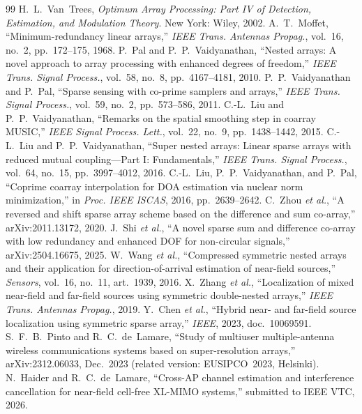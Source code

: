 \documentclass[11pt]{article}
\begin{document}
\begin{thebibliography}{99}\small
{} H.~L.~Van~Trees, \emph{Optimum Array Processing: Part IV of Detection,
Estimation, and Modulation Theory}. New York: Wiley, 2002.
 A.~T.~Moffet, ``Minimum-redundancy linear arrays,'' \emph{IEEE Trans.
Antennas Propag.}, vol.~16, no.~2, pp.~172--175, 1968.
 P.~Pal and P.~P.~Vaidyanathan, ``Nested arrays: A novel approach to array
processing with enhanced degrees of freedom,'' \emph{IEEE Trans. Signal Process.}, vol.~58, no.~8,
pp.~4167--4181, 2010.
 P.~P.~Vaidyanathan and P.~Pal, ``Sparse sensing with co-prime
samplers and arrays,'' \emph{IEEE Trans. Signal Process.}, vol.~59, no.~2, pp.~573--586, 2011.
 C.-L.~Liu and P.~P.~Vaidyanathan, ``Remarks on the spatial smoothing step in
coarray MUSIC,'' \emph{IEEE Signal Process. Lett.}, vol.~22, no.~9, pp.~1438--1442, 2015.
 C.-L.~Liu and P.~P.~Vaidyanathan, ``Super nested arrays: Linear sparse
arrays with reduced mutual coupling---Part I: Fundamentals,'' \emph{IEEE Trans. Signal Process.},
vol.~64, no.~15, pp.~3997--4012, 2016.
 C.-L.~Liu, P.~P.~Vaidyanathan, and P.~Pal, ``Coprime coarray interpolation
for DOA estimation via nuclear norm minimization,'' in \emph{Proc. IEEE ISCAS}, 2016, pp.~2639--2642.
 C.~Zhou \emph{et al.}, ``A reversed and shift sparse array scheme based on
the difference and sum co-array,'' arXiv:2011.13172, 2020.
 J.~Shi \emph{et al.}, ``A novel sparse sum and difference co-array with low
redundancy and enhanced DOF for non-circular signals,'' arXiv:2504.16675, 2025.
 W.~Wang \emph{et al.}, ``Compressed symmetric nested arrays and their
application for direction-of-arrival estimation of near-field sources,'' \emph{Sensors}, vol.~16,
no.~11, art.~1939, 2016.
 X.~Zhang \emph{et al.}, ``Localization of mixed near-field and far-field
sources using symmetric double-nested arrays,'' \emph{IEEE Trans. Antennas Propag.}, 2019.
 Y.~Chen \emph{et al.}, ``Hybrid near- and far-field source localization using
symmetric sparse array,'' \emph{IEEE}, 2023, doc.~10069591.
 S.~F.~B.~Pinto and R.~C.~de~Lamare, ``Study of multiuser multiple-antenna
wireless communications systems based on super-resolution arrays,'' arXiv:2312.06033, Dec.\ 2023
(related version: EUSIPCO~2023, Helsinki).
 N.~Haider and R.~C.~de~Lamare, ``Cross-AP channel estimation and interference
cancellation for near-field cell-free XL-MIMO systems,'' submitted to IEEE VTC, 2026.
\end{thebibliography}
\end{document}
